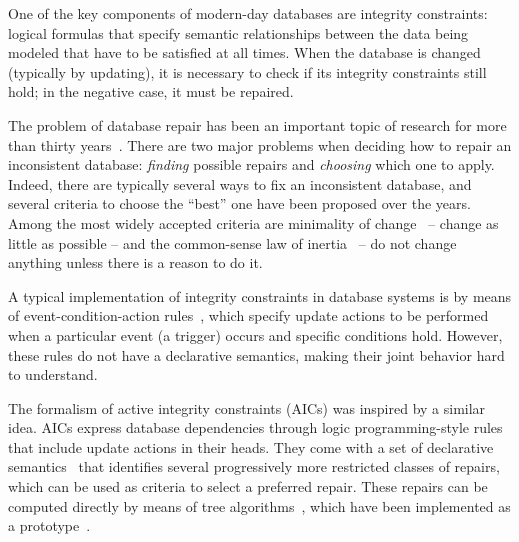 One of the key components of modern-day databases are integrity constraints: logical formulas that specify semantic relationships between the data being modeled that have to be satisfied at all times.
When the database is changed (typically by updating), it is necessary to check if its integrity constraints still hold; in the negative case, it must be repaired.

The problem of database repair has been an important topic of research for more than thirty years~\cite{icdt/Abiteboul88}.
There are two major problems when deciding how to repair an inconsistent database: \emph{finding} possible repairs and \emph{choosing} which one to apply.
Indeed, there are typically several ways to fix an inconsistent database, and several criteria to choose the ``best'' one have been proposed over the years.
Among the most widely accepted criteria are minimality of change~\cite{Winslett90,ai/EiterG92} -- change as little as possible -- and the common-sense law of inertia~\cite{PrzymusinskiT97} -- do not change anything unless there is a reason to do it.

A typical implementation of integrity constraints in database systems is by means of event-condition-action rules~\cite{TenienteO95,WidomC96}, which specify update actions to be performed when a particular event (a trigger) occurs and specific conditions hold.
However, these rules do not have a declarative semantics, making their joint behavior hard to understand.

The formalism of active integrity constraints (AICs) \cite{ppdp/FlescaGZ04} was inspired by a similar idea.
AICs express database dependencies through logic programming-style rules that include update actions in their heads.
They come with a set of declarative semantics~\cite{tplp/CaropreseT11} that identifies several progressively more restricted classes of repairs, which can be used as criteria to select a preferred repair.
These repairs can be computed directly by means of tree algorithms~\cite{tase/Cruz-FilipeEGN13}, which have been implemented as a prototype~\cite{CFHLNS15}.

